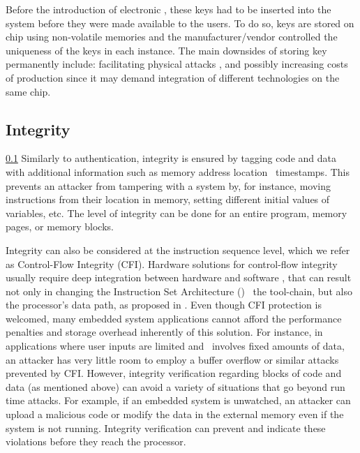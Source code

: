 Before the introduction of electronic \pufs \cite{Gassend2002:PUFs}, these keys had to be inserted into the system  before they were made available to the users. To do so, keys are stored on chip using non-volatile memories and the manufacturer\slash{}vendor controlled the uniqueness of the keys in each instance. The main downsides of storing key permanently include: facilitating physical attacks \cite{Sadeghi2010:Security-PUFs}, and possibly increasing costs of production since it may demand integration of different technologies on the same chip.

\subsection{Integrity}
\label{subsec:integrity}
\ref{subsec:integrity}
Similarly  to authentication, integrity is ensured by tagging code and data with additional information such as memory address location \andor~timestamps. This prevents an attacker from tampering with a system by, for instance, moving instructions from their location in memory, setting different initial values of variables, etc. The level of integrity can be done for an entire program, memory pages, or memory blocks. 

Integrity can also be considered at the instruction sequence level, which we refer as Control-Flow Integrity (CFI). Hardware solutions for control-flow integrity usually require deep integration between hardware and software \cite{Davi2015:HAFIX}, that can result not only in changing the Instruction Set Architecture (\isa) \andor~the tool-chain, but also the processor's data path, as proposed in \cite{Gelbart2005:CODESSEAL, Kanuparthi2012:DynamicIntegrity}. Even though CFI protection is welcomed, many embedded system applications cannot afford the performance penalties and storage overhead inherently of this solution. For instance, in applications where user inputs are limited and \io~involves fixed amounts of data, an attacker has very little room to employ a buffer overflow or similar attacks prevented by CFI. However, integrity verification regarding blocks of code and data (as mentioned above) can avoid a variety of situations that go beyond run time attacks. For example, if an embedded system is unwatched, an attacker can upload a malicious code or modify the data in the external memory even if the system is not running. Integrity verification can prevent and indicate these violations before they reach the processor.


